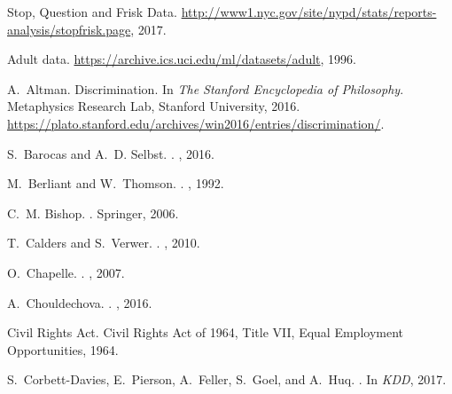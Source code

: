 \documentclass{article}
\begin{document}
\small 
\begin{thebibliography}{10}

{Stop, Question and Frisk Data}.
\newblock
  \href{http://www1.nyc.gov/site/nypd/stats/reports-analysis/stopfrisk.page}{http://www1.nyc.gov/site/nypd/stats/reports-analysis/stopfrisk.page},
  2017.

{Adult data}.
\newblock
  \href{https://archive.ics.uci.edu/ml/datasets/adult}{https://archive.ics.uci.edu/ml/datasets/adult},
  1996.

A.~Altman.
\newblock Discrimination.
\newblock In {\em The Stanford Encyclopedia of Philosophy}. Metaphysics
  Research Lab, Stanford University, 2016.
\newblock
  \href{https://plato.stanford.edu/archives/win2016/entries/discrimination/}{https://plato.stanford.edu/archives/win2016/entries/discrimination/}.

S.~Barocas and A.~D. Selbst.
.
, 2016.

M.~Berliant and W.~Thomson.
.
, 1992.

C.~M. Bishop.
.
\newblock Springer, 2006.

T.~Calders and S.~Verwer.
.
, 2010.

O.~Chapelle.
.
, 2007.

A.~Chouldechova.
.
, 2016.

{Civil Rights Act}.
\newblock Civil Rights Act of 1964, Title VII, Equal Employment Opportunities,
  1964.

S.~Corbett-Davies, E.~Pierson, A.~Feller, S.~Goel, and A.~Huq.
.
\newblock In {\em {KDD}}, 2017.


\end{thebibliography}
\end{document}
